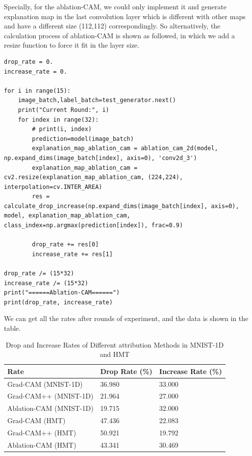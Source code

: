 \documentclass[conference]{IEEEtran}
\begin{document}
Specially, for the ablation-CAM, we could only implement it and generate explanation map in the last convolution layer which is different with other maps and have a different size (112,112) correspondingly. So alternatively, the calculation process of ablation-CAM is shown as followed, in which we add a resize function to force it fit in the layer size.

\begin{lstlisting}
drop_rate = 0.
increase_rate = 0.

for i in range(15):
    image_batch,label_batch=test_generator.next()
    print("Current Round:", i)
    for index in range(32):
        # print(i, index)
        prediction=model(image_batch)
        explanation_map_ablation_cam = ablation_cam_2d(model, np.expand_dims(image_batch[index], axis=0), 'conv2d_3')
        explanation_map_ablation_cam = cv2.resize(explanation_map_ablation_cam, (224,224), interpolation=cv.INTER_AREA)
        res = calculate_drop_increase(np.expand_dims(image_batch[index], axis=0), model, explanation_map_ablation_cam, class_index=np.argmax(prediction[index]), frac=0.9)

        drop_rate += res[0]
        increase_rate += res[1]

drop_rate /= (15*32)
increase_rate /= (15*32)
print("======Ablation-CAM======")
print(drop_rate, increase_rate)
\end{lstlisting}

We can get all the rates after rounds of experiment, and the data is shown in the table.

\begin{table}[h]
\caption{Drop and Increase Rates of Different attribution Methods in MNIST-1D and HMT}
\begin{tabular}{|l|l|l|}
\hline
Rate                    & Drop Rate (\%) & Increase Rate (\%) \\ \hline
Grad-CAM (MNIST-1D)     & 36.980         & 33.000             \\ \hline
Grad-CAM++ (MNIST-1D)   & 21.964         & 27.000             \\ \hline
Ablation-CAM (MNIST-1D) & 19.715         & 32.000             \\ \hline
Grad-CAM (HMT)          & 47.436         & 22.083             \\ \hline
Grad-CAM++ (HMT)        & 50.921         & 19.792             \\ \hline
Ablation-CAM (HMT)      & 43.341         & 30.469             \\ \hline
\end{tabular}
\end{table}
\end{document}
